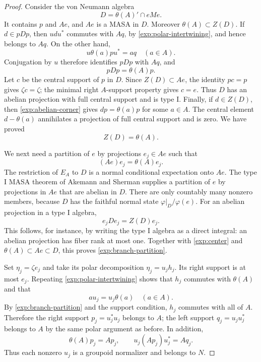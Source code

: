 \begin{proof}
Consider the von Neumann algebra
\[
 D=\theta(A)'\cap eMe.
\]
It contains $p$ and $Ae$, and $Ae$ is a MASA in $D$.
Moreover $\theta(A)\subset Z(D)$.  If $d\in pDp$, then $udu^*$ commutes
with $Aq$, by \eqref{exp:polar-intertwining}, and hence belongs to $Aq$.
On the other hand,
\[
 u\theta(a)p u^*=aq\quad(a\in A).
\]
Conjugation by $u$ therefore identifies $pDp$ with $Aq$, and
\begin{equation}\label{exp:abelian-corner}
 pDp=\theta(A)p.
\end{equation}
Let $c$ be the central support of $p$ in $D$.  Since
$Z(D)\subset Ae$, the identity $pc=p$ gives $\zeta c=\zeta$; the minimal
right $A$-support property gives $c=e$.  Thus $D$ has an abelian projection
with full central support and is type I.  Finally, if $d\in Z(D)$, then
\eqref{exp:abelian-corner} gives $dp=\theta(a)p$ for some $a\in A$.
The central element $d-\theta(a)$ annihilates a projection of full central
support and is zero.  We have proved
\begin{equation}\label{exp:center}
 Z(D)=\theta(A).
\end{equation}

We next need a partition of $e$ by projections $e_j\in Ae$ such that
\begin{equation}\label{exp:branch-partition}
 (Ae)e_j=\theta(A)e_j.
\end{equation}
The restriction of $E_A$ to $D$ is a normal conditional expectation onto
$Ae$.  The type I MASA theorem of Akemann and Sherman
\cite[Theorem~4.1]{AS12} supplies a partition of $e$ by projections in
$Ae$ that are abelian in $D$.  There are only countably many nonzero
members, because $D$ has the faithful normal state
$\varphi|_D/\varphi(e)$.  For an abelian projection in a type I algebra,
\[
 e_jDe_j=Z(D)e_j.
\]
This follows, for instance, by writing the type I algebra as a direct
integral: an abelian projection has fiber rank at most one.  Together
with \eqref{exp:center} and $\theta(A)\subset Ae\subset D$, this proves
\eqref{exp:branch-partition}.

Set $\eta_j=\zeta e_j$ and take its polar decomposition
$\eta_j=u_j h_j$.  Its right support is at most $e_j$.  Repeating
\eqref{exp:polar-intertwining} shows that $h_j$ commutes with $\theta(A)$
and that
\[
 au_j=u_j\theta(a)\quad(a\in A).
\]
By \eqref{exp:branch-partition} and the support condition, $h_j$ commutes
with all of $A$.  Therefore the right support $p_j=u_j^*u_j$ belongs to
$A$; the left support $q_j=u_ju_j^*$ belongs to $A$ by the same polar
argument as before.  In addition,
\[
 \theta(A)p_j=Ap_j,\qquad
 u_j(Ap_j)u_j^*=Aq_j.
\]
Thus each nonzero $u_j$ is a groupoid normalizer and belongs to $N$.


\end{proof}
